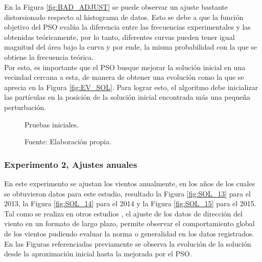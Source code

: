 En la Figura \ref{fig:BAD_ADJUST} se puede observar un ajuste bastante distorsionado respecto al histograma de datos. Esto se debe a que la función objetivo del PSO evalúa la diferencia entre las frecuencias experimentales y las obtenidas teóricamente, por lo tanto, diferentes curvas pueden tener igual magnitud del área bajo la curva y por ende, la misma probabilidad con la que se obtiene la frecuencia teórica.\\
Por esto, es importante que el PSO busque mejorar la solución inicial en una vecindad cercana a esta, de manera de obtener una evolución como la que se aprecia en la Figura \ref{fig:EV_SOL}. Para lograr esto, el algoritmo debe inicializar las partículas en la posición de la solución inicial encontrada más una pequeña perturbación.   
\begin{figure}[ht!]
     \centering
     \captionsetup{justification=centering,margin=2cm}
    \caption{Pruebas iniciales.}
    \caption*{Fuente: Elaboración propia.}
    \label{fig:subfigures}
\end{figure}

\subsubsection{Experimento 2, Ajustes anuales}
En este experimento se ajustan los vientos anualmente, en los años de los cuales se obtuvieron datos para este estudio, resultado la Figura \ref{fig:SOL_13} para el 2013, la Figura \ref{fig:SOL_14} para el 2014 y la Figura \ref{fig:SOL_15} para el 2015.
Tal como se realiza en otros estudios \cite{Heckenbergerova15} \cite{Winddirelse15}, el ajuste de los datos de dirección del viento en un formato
de largo plazo, permite observar el comportamiento global de los vientos pudiendo evaluar la norma o generalidad en los datos registrados.
En las Figuras referenciadas previamente se observa la evolución de la solución desde la aproximación inicial hasta la mejorada por el PSO.


